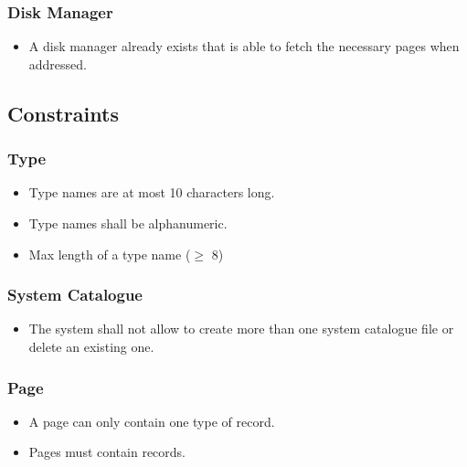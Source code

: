 \documentclass{article}
\begin{document}
        \subsubsection{Disk Manager}
            \begin{itemize}
                \item A disk manager already exists that is able to fetch the necessary pages when addressed.
            \end{itemize}
    \subsection{Constraints}
        \subsubsection{Type}
            \begin{itemize}
                \item Type names are at most 10 characters long.
                \item Type names shall be alphanumeric.
                \item Max length of a type name ($\geq$ 8)
            \end{itemize}
        \subsubsection{System Catalogue}
            \begin{itemize}
                \item The system shall not allow to create more than one system catalogue file or delete an existing one.
            \end{itemize}
        \subsubsection{Page}
             \begin{itemize}
                \item A page can only contain one type of record.
                \item Pages must contain records.
            \end{itemize}
\end{document}
